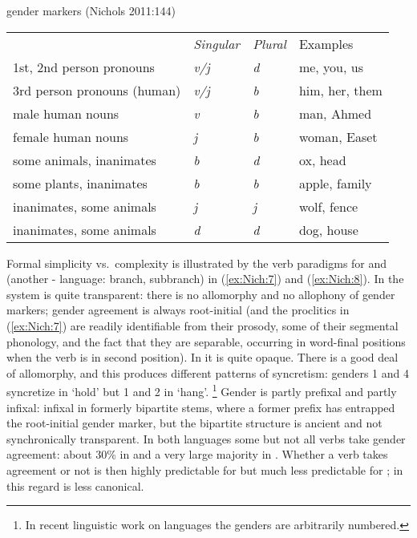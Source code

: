 \documentclass[output=collectionpaper]{langsci/langscibook}
\begin{document}
\ea
\label{ex:Nich:6}
 gender markers (Nichols 2011:144)\\
\begin{tabular}{l>{\itshape}l>{\itshape}ll}
					 &	{\normalfont Singular} &	{\normalfont Plural} &	{\normalfont Examples} \\
1st, 2nd person pronouns & 			v/j	 &	d  &		me, you, us \\
3rd person pronouns (human) 	 &	v/j	 &	b 	 &	him, her, them \\
male human nouns 			 &	v 	 &	b 	 &	man, Ahmed \\
female human nouns			  &	j 	 &	b 	 &	woman, Easet \\
some animals, inanimates 		 &	b  &		d  &		ox, head \\
some plants, inanimates	 &		b 		 &b	 &	apple, family \\
inanimates, some animals  &			j 	 &	j  &		wolf, fence \\
inanimates, some animals  &			d 	 &	d  &		dog, house \\
\end{tabular}
\z

Formal simplicity vs.\ complexity is illustrated by the verb paradigms for  and  (another - language:  branch,  subbranch) in (\ref{ex:Nich:7}) and (\ref{ex:Nich:8}). In  the system is quite transparent: there is no allomorphy and no allophony of gender markers; gender agreement is always root-initial (and the proclitics in (\ref{ex:Nich:7}) are readily identifiable from their prosody, some of their segmental phonology, and the fact that they are separable, occurring in word-final positions when the verb is in second position). In  it is quite opaque. There is a good deal of allomorphy, and this produces different patterns of syncretism: genders 1 and 4 syncretize in `hold' but 1 and 2 in `hang'.%
\footnote{%
In recent linguistic work on  languages the genders are arbitrarily numbered.
} %
Gender is partly prefixal and partly infixal: infixal in formerly bipartite stems, where a former prefix has entrapped the root-initial gender marker, but the bipartite structure is ancient and not synchronically transparent. In both languages some but not all verbs take gender agreement: about 30\% in  and a very large majority in . Whether a verb takes agreement or not is then highly predictable for  but much less predictable for ; in this regard  is less canonical.
\end{document}
